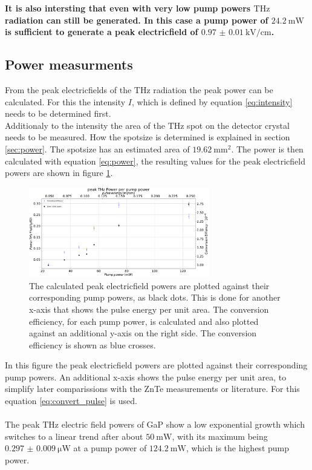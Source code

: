 \textbf{It is also intersting that even with very low pump powers $\si{\tera\hertz}$ radiation can still be generated.
In this case a pump power of $\SI{24.2}{\milli\W}$ is sufficient to generate a peak electricfield of $\SI{0.97(1)}{\kilo\V\per\centi\meter}$.}
\FloatBarrier
\subsection{Power measurments}
From the peak electricfields of the $\si{\tera\hertz}$ radiation the peak power can be calculated.
For this the intensity $I$, which is defined by equation \ref{eq:intensity} needs to be determined first.
\\
Additionaly to the intensity the area of the $\si{\tera\hertz}$ spot on the detector crystal needs to be measured.
How the spotsize is determined is explained in section \ref{sec:power}.
The spotsize has an estimated area of $\SI{19.62}{\milli\meter\squared}$.
The power is then calculated with equation \ref{eq:power}, the resulting values for the peak electricfield powers are shown in figure \ref{fig:gap_power}.
\begin{figure}
    \centering
    \includegraphics[width=0.7\textwidth]{Plots/Powergap.pdf}
    \caption{The calculated peak electricfield powers are plotted against their corresponding pump powers, as black dots.
    This is done for another x-axis that shows the pulse energy per unit area.
    The conversion efficiency, for each pump power, is calculated and also plotted against an additional y-axis on the right side.
    The conversion efficiency is shown as blue crosses.}
    \label{fig:gap_power}
\end{figure}
In this figure the peak electricfield powers are plotted against their corresponding pump powers.
An additional x-axis shows the pulse energy per unit area, to simplify later comparissions with the ZnTe measurements or literature.
For this equation \ref{eq:convert_pulse} is used.
\\\\
The peak $\si{\tera\hertz}$ electric field powers of GaP show a low exponential growth which switches to a linear trend after about $\SI{50}{\milli\W}$, with its maximum being $\SI{0.297(9)}{\micro\W}$ at a pump power of $\SI{124.2}{\milli\W}$, which is the highest pump power.
